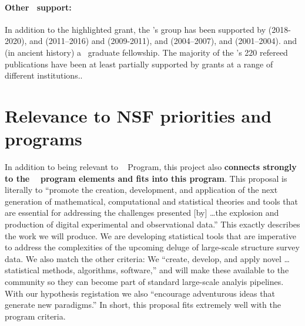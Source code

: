 \documentclass[12pt, fullpage, letterpaper]{article}
\begin{document}
\paragraph{Other \NSF\ support:}
In addition to the highlighted grant, the \PI's group has been supported by
 (2018-2020),
and
 (2011--2016)
and
 (2009-2011),
and
 (2004--2007),
and
 (2001--2004).
and (in ancient history) a \NSF\ graduate fellowship.
The majority of the \PI's 220 refereed publications have been at least partially supported
by \NSF grants at a range of different institutions..

\section{Relevance to NSF priorities and programs}

In addition to being relevant to \NSF\  Program, this
project also \textbf{connects strongly to the \NSF\ 
program elements and fits into this program}.
This proposal is literally to ``promote the creation,
development, and application of the next generation of mathematical,
computational and statistical theories and tools that are essential
for addressing the challenges presented [by] \ldots the explosion and production of digital
experimental and observational data.'' This exactly describes the work we will produce.
We are developing statistical tools that are imperative to address the complexities of the upcoming deluge of large-scale structure survey data.
We also match the other  criteria:
We ``create, develop, and apply novel \ldots statistical methods, algorithms, software,'' and will make these available to the community so they can become part of standard large-scale analyis pipelines.
With our hypothesis registation we also ``encourage adventurous ideas that generate
new paradigms.'' In short, this proposal fits extremely well with the  program
criteria.
\end{document}

